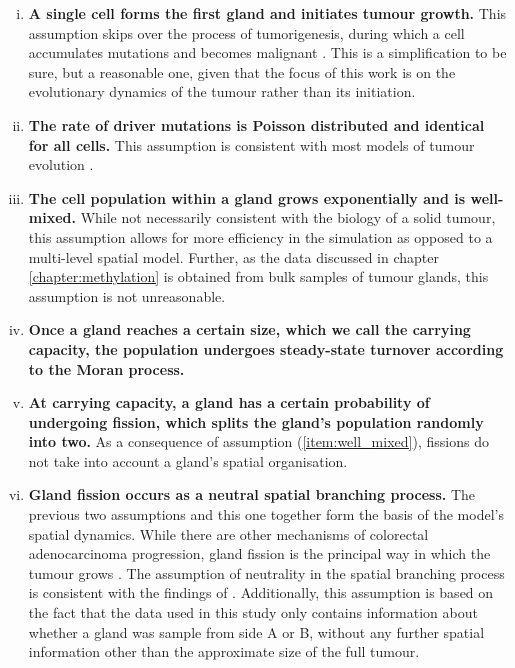\begin{enumerate}[(i)]
    \item \textbf{A single cell forms the first gland and initiates tumour
        growth.} This assumption skips over the process of tumorigenesis,
        during which a cell accumulates mutations and becomes malignant
        \cite{tariq_colorectal_2016}. This is a simplification to be sure, but
        a reasonable one, given that the focus of this work is on the
        evolutionary dynamics of the tumour rather than its initiation.
    \item \textbf{The rate of driver mutations is Poisson distributed and
        identical for all cells.} This assumption is consistent with most
        models of tumour evolution \cite{metzcar_review_2019,
        niida_modeling_2021}.
    \item \textbf{The cell population within a gland grows exponentially and is
        well-mixed.} While not necessarily consistent with the biology of a
        solid tumour, this assumption allows for more efficiency in the
        simulation as opposed to a multi-level spatial model. Further, as the
        data discussed in chapter \ref{chapter:methylation} is obtained from
        bulk samples of tumour glands, this assumption is not unreasonable.
        \label{item:well_mixed}
    \item \textbf{Once a gland reaches a certain size, which we call the
        carrying capacity, the population undergoes steady-state turnover
        according to the Moran process.}
    \item \textbf{At carrying capacity, a gland has a certain probability of
        undergoing fission, which splits the gland's population randomly into
        two.} As a consequence of assumption (\ref{item:well_mixed}), fissions
        do not take into account a gland's spatial organisation.
    \item \textbf{Gland fission occurs as a neutral spatial branching process.}
        The previous two assumptions and this one together form the basis of
        the model's spatial dynamics. While there are other mechanisms of
        colorectal adenocarcinoma progression, gland fission is the principal
        way in which the tumour grows \cite{preston_bottom-up_nodate}. The
        assumption of neutrality in the spatial branching process is consistent
        with the findings of \cite{sottoriva_big_2015}. Additionally, this
        assumption is based on the fact that the data used in this study only
        contains information about whether a gland was sample from side A or B,
        without any further spatial information other than the approximate size
        of the full tumour.
\end{enumerate}


